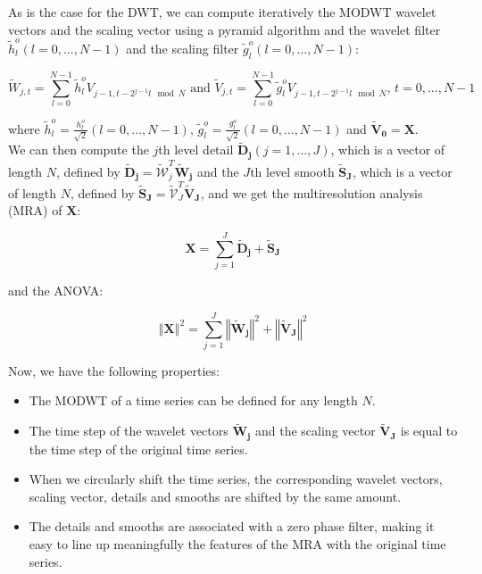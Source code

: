 \documentclass[main.tex]{subfiles}
\begin{document}
As is the case for the DWT, we can compute iteratively the MODWT wavelet vectors and the scaling vector using a pyramid algorithm and the wavelet filter $\widetilde{h}_l^o \left( l = 0 , ... , N - 1 \right)$ and the scaling filter $\widetilde{g}_l^o \left( l = 0 , ... , N - 1 \right)$:

\begin{equation}
\widetilde{W}_{j , t} = \sum_{l = 0}^{N - 1} \widetilde{h}_l^o V_{j - 1 , t - 2^{j - 1} l \mod N} \text{ and } \widetilde{V}_{j , t} = \sum_{l = 0}^{N - 1} \widetilde{g}_l^o V_{j - 1 , t - 2^{j - 1} l \mod N} \text{, } t = 0 , ... , N - 1
\end{equation}

where $\widetilde{h}_l^o = \frac{h_l^o}{\sqrt{2}} \left( l = 0 , ... , N - 1 \right)$,  $\widetilde{g}_l^o = \frac{g_l^o}{\sqrt{2}} \left( l = 0 , ... , N - 1 \right)$ and $\bm{\widetilde{V}_0} = \bm{X}$. \\

We can then compute the $j$th level detail $\bm{\widetilde{D}_j} \left( j = 1 , ... , J \right)$, which is a vector of length $N$, defined by $\bm{\widetilde{D}_j} = \widetilde{\mathcal{W}}_j^T \bm{\widetilde{W}_j}$ and the $J$th level smooth $\bm{\widetilde{S}_J}$, which is a vector of length $N$, defined by $\bm{\widetilde{S}_J} = \widetilde{\mathcal{V}}_J^T \bm{\widetilde{V}_J}$, and we get the multiresolution analysis (MRA) of $\bm{X}$:

\begin{equation}
\bm{X} = \sum_{j = 1}^{J} \bm{\widetilde{D}_j} + \bm{\widetilde{S}_J}
\end{equation}

and the ANOVA:

\begin{equation}
\left\Vert \bm{X} \right\Vert ^2 = \sum_{j = 1}^{J} \left\Vert \bm{\widetilde{W}_j} \right\Vert ^2 + \left\Vert \bm{\widetilde{V}_J} \right\Vert ^2
\end{equation}

Now, we have the following properties:

\begin{itemize}
	\item The MODWT of a time series can be defined for any length $N$.
	\item The time step of the wavelet vectors $\bm{\widetilde{W}_j}$ and the scaling vector $\bm{\widetilde{V}_J}$ is equal to the time step of the original time series.
	\item When we circularly shift the time series, the corresponding wavelet vectors, scaling vector, details and smooths are shifted by the same amount.
	\item The details and smooths are associated with a zero phase filter, making it easy to line up meaningfully the features of the MRA with the original time series.
\end{itemize}
\end{document}
